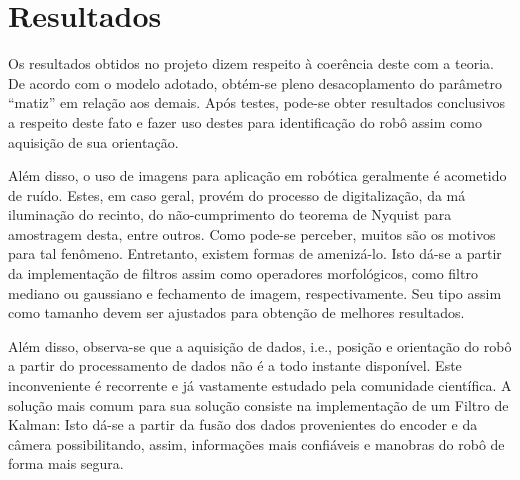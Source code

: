 \chapter{Resultados}

Os resultados obtidos no projeto dizem respeito à coerência deste com a teoria. De acordo com o modelo adotado, obtém-se pleno desacoplamento do parâmetro “matiz” em relação aos demais. Após testes, pode-se obter resultados conclusivos a respeito deste fato e fazer uso destes para identificação do robô assim como aquisição de sua orientação.

Além disso, o uso de imagens para aplicação em robótica geralmente é acometido de ruído. Estes, em caso geral, provém do processo de digitalização, da má iluminação do recinto, do não-cumprimento do teorema de Nyquist para amostragem desta, entre outros. Como pode-se perceber, muitos são os motivos para tal fenômeno. Entretanto, existem formas de amenizá-lo. Isto dá-se a partir da implementação de filtros assim como operadores morfológicos, como filtro mediano ou gaussiano e fechamento de imagem, respectivamente. Seu tipo assim como tamanho devem ser ajustados para obtenção de melhores resultados.
 
Além disso, observa-se que a aquisição de dados, i.e., posição e orientação do robô a partir do processamento de dados não é a todo instante disponível. Este inconveniente é recorrente e já vastamente estudado pela comunidade científica. A solução mais comum para sua solução consiste na implementação de um Filtro de Kalman: Isto dá-se a partir da fusão dos dados provenientes do encoder e da câmera possibilitando, assim, informações mais confiáveis e manobras do robô de forma mais segura. 
